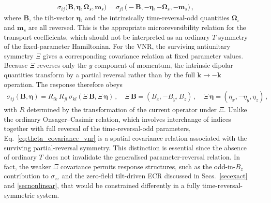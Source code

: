 \documentclass[aps,prb,onecolumn,nofootinbib,citeautoscript,10pt]{revtex4-2}
\newcommand{\bs}[1]{\boldsymbol{#1}}
\begin{document}
\begin{align}
\label{eq:generalized_onsager}
\sigma_{ij}\bigl(\bs B,\bs\eta,\bs\Omega_s,\bs m_s\bigr)
= \sigma_{ji} \,\bigl(-\bs B,-\bs\eta,-\bs\Omega_s,-\bs m_s\bigr)\,,
\end{align}
where $\bs B$, the tilt-vector $\bs\eta$, and the intrinsically time-reversal-odd quantities $\bs\Omega_s$ and $\bs m_s$ are all reversed. This is the appropriate microreversibility relation for the transport coefficients, which should not be interpreted as an ordinary $T$ symmetry of the fixed-parameter Hamiltonian. For the VNR, the surviving antiunitary symmetry $\Xi$ gives a corresponding covariance relation at fixed parameter values. Because $\Xi$ reverses only the $y$ component of momentum, the intrinsic dipolar quantities transform by a partial reversal rather than by the full $\bs k\to-\bs k$ operation. The response therefore obeys
\begin{align}
\label{eq:theta_covariance_vnr}
\sigma_{ij}(\bs B,\bs\eta)
=R_{ik}\, R_{jl}\,\sigma_{kl}(\Xi\,\bs B,\Xi \,\bs\eta)\,, \quad
\Xi\,\bs B=(B_x,-B_y,B_z)\,, \quad \Xi \, \bs\eta=(\eta_x,-\eta_y,\eta_z)\,,
\end{align}
with $R$ determined by the transformation of the current operator under $\Xi$. Unlike the ordinary Onsager--Casimir relation, which involves interchange of indices together with full reversal of the time-reversal-odd parameters, Eq.~\eqref{eq:theta_covariance_vnr} is a spatial covariance relation associated with the surviving partial-reversal symmetry. This distinction is essential since the absence of ordinary $T$ does not invalidate the generalised parameter-reversal relation. In fact, the weaker $\Xi$ covariance permits response structures, such as the odd-in-$B_z$ contribution to $\sigma_{zz}$ and the zero-field tilt-driven ECR discussed in Secs.~\ref{secexact} and \ref{secnonlinear}, that would be constrained differently in a fully time-reversal-symmetric system.
\end{document}
